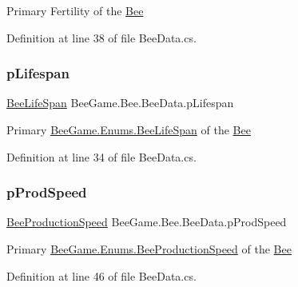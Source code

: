 Primary Fertility of the \hyperlink{namespace_bee_game_1_1_bee}{Bee} 



Definition at line 38 of file Bee\+Data.\+cs.

\mbox{\label{struct_bee_game_1_1_bee_1_1_bee_data_aa24b1efdb25e8c5592d88940f9afc1e9}} 
\subsubsection{\texorpdfstring{p\+Lifespan}{pLifespan}}
{\footnotesize\ttfamily \hyperlink{namespace_bee_game_1_1_enums_ae3853807ded2f4d99a0d4a7fb4b2bc46}{Bee\+Life\+Span} Bee\+Game.\+Bee.\+Bee\+Data.\+p\+Lifespan}



Primary \hyperlink{namespace_bee_game_1_1_enums_ae3853807ded2f4d99a0d4a7fb4b2bc46}{Bee\+Game.\+Enums.\+Bee\+Life\+Span} of the \hyperlink{namespace_bee_game_1_1_bee}{Bee} 



Definition at line 34 of file Bee\+Data.\+cs.

\mbox{\label{struct_bee_game_1_1_bee_1_1_bee_data_a8fa39d271a23500ad826041b46d9feaf}} 
\subsubsection{\texorpdfstring{p\+Prod\+Speed}{pProdSpeed}}
{\footnotesize\ttfamily \hyperlink{namespace_bee_game_1_1_enums_afee18200a21cc4b8e1d0cdb669930f14}{Bee\+Production\+Speed} Bee\+Game.\+Bee.\+Bee\+Data.\+p\+Prod\+Speed}



Primary \hyperlink{namespace_bee_game_1_1_enums_afee18200a21cc4b8e1d0cdb669930f14}{Bee\+Game.\+Enums.\+Bee\+Production\+Speed} of the \hyperlink{namespace_bee_game_1_1_bee}{Bee} 



Definition at line 46 of file Bee\+Data.\+cs.

